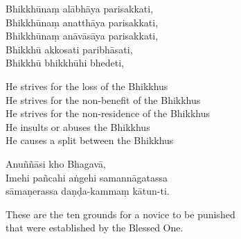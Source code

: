 Bhikkhūnaṃ alābhāya parisakkati,\\
Bhikkhūnaṃ anatthāya parisakkati,\\
Bhikkhūnaṃ anāvāsāya parisakkati,\\
Bhikkhū akkosati paribhāsati,\\
Bhikkhū bhikkhūhi bhedeti,

\begin{english}
  He strives for the loss of the Bhikkhus\\
  He strives for the non-benefit of the Bhikkhus\\
  He strives for the non-residence of the Bhikkhus\\
  He insults or abuses the Bhikkhus\\
  He causes a split between the Bhikkhus
\end{english}

Anuññāsi kho Bhagavā,\\
Imehi pañcahi aṅgehi samannāgatassa\\
sāmaṇerassa daṇḍa-kammaṃ kātun-ti.

\begin{english}
  These are the ten grounds for a novice to be punished\\
  that were established by the Blessed One.
\end{english}

